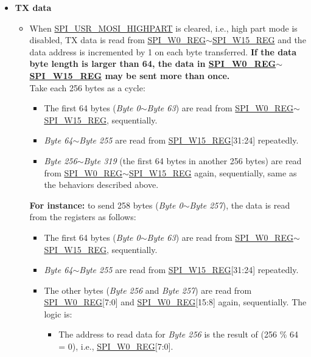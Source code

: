 \documentclass[main\_\_EN.tex]{subfiles}
\begin{document}
\begin{itemize}
    \item \textbf{TX data}
    \begin{itemize}
        \item When \hyperref[fielddesc:SPIUSRMOSIHIGHPART]{SPI\_USR\_MOSI\_HIGHPART} is cleared, i.e., high part mode is disabled, TX data is read from \hyperref[regdesc:SPIW0REG]{SPI\_W0\_REG}$\sim$\hyperref[regdesc:SPIW0REG]{SPI\_W15\_REG} and the data address is incremented by 1 on each byte transferred. \textbf{If the data byte length is larger than 64, the data in \hyperref[regdesc:SPIW0REG]{SPI\_W0\_REG}$\sim$\hyperref[regdesc:SPIW0REG]{SPI\_W15\_REG} may be sent more than once.} \\
        Take each 256 bytes as a cycle:
        \begin{itemize}
            \item The first 64 bytes (\emph{Byte 0}$\sim$\emph{Byte 63}) are read from \hyperref[regdesc:SPIW0REG]{SPI\_W0\_REG}$\sim$\hyperref[regdesc:SPIW0REG]{SPI\_W15\_REG}, sequentially.
            \item \emph{Byte 64}$\sim$\emph{Byte 255} are read from \hyperref[regdesc:SPIW0REG]{SPI\_W15\_REG}[31:24] repeatedly.
            \item \emph{Byte 256}$\sim$\emph{Byte 319} (the first 64 bytes in another 256 bytes) are read from \hyperref[regdesc:SPIW0REG]{SPI\_W0\_REG}$\sim$\hyperref[regdesc:SPIW0REG]{SPI\_W15\_REG} again, sequentially, same as the behaviors described above.
        \end{itemize}
        \textbf{For instance:} to send 258 bytes (\emph{Byte 0}$\sim$\emph{Byte 257}), the data is read from the registers as follows:
        \begin{itemize}
            \item The first 64 bytes (\emph{Byte 0}$\sim$\emph{Byte 63}) are read from \hyperref[regdesc:SPIW0REG]{SPI\_W0\_REG}$\sim$\hyperref[regdesc:SPIW0REG]{SPI\_W15\_REG}, sequentially.
            \item \emph{Byte 64}$\sim$\emph{Byte 255} are read from \hyperref[regdesc:SPIW0REG]{SPI\_W15\_REG}[31:24] repeatedly.
            \item The other bytes (\emph{Byte 256} and \emph{Byte 257}) are read from \hyperref[regdesc:SPIW0REG]{SPI\_W0\_REG}[7:0] and \hyperref[regdesc:SPIW0REG]{SPI\_W0\_REG}[15:8] again, sequentially. The logic is:
            \begin{itemize}
                \item The address to read data for \emph{Byte 256} is the result of (256 \% 64 = 0), i.e., \hyperref[regdesc:SPIW0REG]{SPI\_W0\_REG}[7:0].

\end{itemize}
\end{itemize}
\end{itemize}
\end{itemize}
\end{document}
